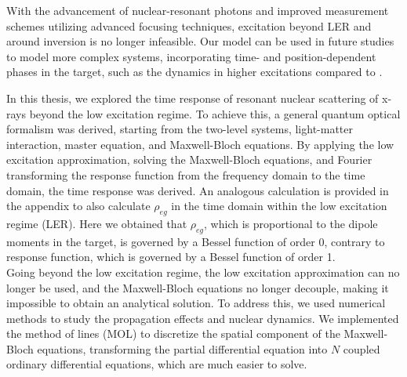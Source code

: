 With the advancement of nuclear-resonant photons \cite{Shvydko2023,superradiance} and improved measurement schemes utilizing advanced focusing techniques, excitation beyond LER and around inversion is no longer infeasible. Our model can be used in future studies to model more complex systems, incorporating time- and position-dependent phases in the target, such as the dynamics in higher excitations compared to \cite{Shvydko2023}.

















































\iffalse 
In this thesis, we explored the time response of resonant nuclear scattering of x-rays beyond the low excitation regime. To achieve this, a general quantum optical formalism was derived, starting from the two-level systems, light-matter interaction, master equation, and Maxwell-Bloch equations. By applying the low excitation approximation, solving the Maxwell-Bloch equations, and Fourier transforming the response function from the frequency domain to the time domain, the time response was derived. An analogous calculation is provided in the appendix to also calculate $\rho_{eg}$ in the time domain within the low excitation regime (LER). Here we obtained that $\rho_{eg}$, which is proportional to the dipole moments in the target, is governed by a Bessel function of order 0, contrary to response function, which is governed by a Bessel function of order 1. \\

Going beyond the low excitation regime, the low excitation approximation can no longer be used, and the Maxwell-Bloch equations no longer decouple, making it impossible to obtain an analytical solution. To address this, we used numerical methods to study the propagation effects and nuclear dynamics. We implemented the method of lines (MOL) to discretize the spatial component of the Maxwell-Bloch equations, transforming the partial differential equation into $N$ coupled ordinary differential equations, which are much easier to solve.\\

